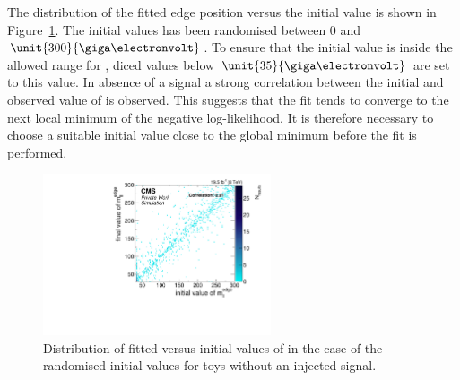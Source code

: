 The distribution of the fitted edge position versus the initial value is shown in Figure~\ref{fig:toys:backgroundOnlyFloatEdge}. The initial values has been randomised between 0 and $\unit{300}{\giga\electronvolt}$. To ensure that the initial value is inside the allowed range for \mlledge, diced values below $\unit{35}{\giga\electronvolt}$ are set to this value. In absence of a signal a strong correlation between the initial and observed value of \mlledge is observed. This suggests that the fit tends to converge to the next local minimum of the negative log-likelihood. It is therefore necessary to choose a suitable initial value close to the global minimum before the fit is performed. 

\begin{figure}[hbp]
  \centering

    \includegraphics[width=0.6\textwidth]{plots/results/fit/toyResults/fittedM0vsinitialM0_backgroundOnly_randM0_NegSig.pdf}
  \caption{Distribution of fitted versus initial values of \mlledge in the case of the randomised initial values for toys without an injected signal.}
  \label{fig:toys:backgroundOnlyFloatEdge}
\end{figure}

